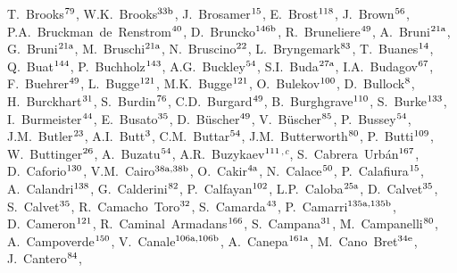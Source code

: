 \begin{flushleft}
T.~Brooks$^\textrm{\scriptsize 79}$,
W.K.~Brooks$^\textrm{\scriptsize 33b}$,
J.~Brosamer$^\textrm{\scriptsize 15}$,
E.~Brost$^\textrm{\scriptsize 118}$,
J.~Brown$^\textrm{\scriptsize 56}$,
P.A.~Bruckman~de~Renstrom$^\textrm{\scriptsize 40}$,
D.~Bruncko$^\textrm{\scriptsize 146b}$,
R.~Bruneliere$^\textrm{\scriptsize 49}$,
A.~Bruni$^\textrm{\scriptsize 21a}$,
G.~Bruni$^\textrm{\scriptsize 21a}$,
M.~Bruschi$^\textrm{\scriptsize 21a}$,
N.~Bruscino$^\textrm{\scriptsize 22}$,
L.~Bryngemark$^\textrm{\scriptsize 83}$,
T.~Buanes$^\textrm{\scriptsize 14}$,
Q.~Buat$^\textrm{\scriptsize 144}$,
P.~Buchholz$^\textrm{\scriptsize 143}$,
A.G.~Buckley$^\textrm{\scriptsize 54}$,
S.I.~Buda$^\textrm{\scriptsize 27a}$,
I.A.~Budagov$^\textrm{\scriptsize 67}$,
F.~Buehrer$^\textrm{\scriptsize 49}$,
L.~Bugge$^\textrm{\scriptsize 121}$,
M.K.~Bugge$^\textrm{\scriptsize 121}$,
O.~Bulekov$^\textrm{\scriptsize 100}$,
D.~Bullock$^\textrm{\scriptsize 8}$,
H.~Burckhart$^\textrm{\scriptsize 31}$,
S.~Burdin$^\textrm{\scriptsize 76}$,
C.D.~Burgard$^\textrm{\scriptsize 49}$,
B.~Burghgrave$^\textrm{\scriptsize 110}$,
S.~Burke$^\textrm{\scriptsize 133}$,
I.~Burmeister$^\textrm{\scriptsize 44}$,
E.~Busato$^\textrm{\scriptsize 35}$,
D.~B\"uscher$^\textrm{\scriptsize 49}$,
V.~B\"uscher$^\textrm{\scriptsize 85}$,
P.~Bussey$^\textrm{\scriptsize 54}$,
J.M.~Butler$^\textrm{\scriptsize 23}$,
A.I.~Butt$^\textrm{\scriptsize 3}$,
C.M.~Buttar$^\textrm{\scriptsize 54}$,
J.M.~Butterworth$^\textrm{\scriptsize 80}$,
P.~Butti$^\textrm{\scriptsize 109}$,
W.~Buttinger$^\textrm{\scriptsize 26}$,
A.~Buzatu$^\textrm{\scriptsize 54}$,
A.R.~Buzykaev$^\textrm{\scriptsize 111}$$^{,c}$,
S.~Cabrera~Urb\'an$^\textrm{\scriptsize 167}$,
D.~Caforio$^\textrm{\scriptsize 130}$,
V.M.~Cairo$^\textrm{\scriptsize 38a,38b}$,
O.~Cakir$^\textrm{\scriptsize 4a}$,
N.~Calace$^\textrm{\scriptsize 50}$,
P.~Calafiura$^\textrm{\scriptsize 15}$,
A.~Calandri$^\textrm{\scriptsize 138}$,
G.~Calderini$^\textrm{\scriptsize 82}$,
P.~Calfayan$^\textrm{\scriptsize 102}$,
L.P.~Caloba$^\textrm{\scriptsize 25a}$,
D.~Calvet$^\textrm{\scriptsize 35}$,
S.~Calvet$^\textrm{\scriptsize 35}$,
R.~Camacho~Toro$^\textrm{\scriptsize 32}$,
S.~Camarda$^\textrm{\scriptsize 43}$,
P.~Camarri$^\textrm{\scriptsize 135a,135b}$,
D.~Cameron$^\textrm{\scriptsize 121}$,
R.~Caminal~Armadans$^\textrm{\scriptsize 166}$,
S.~Campana$^\textrm{\scriptsize 31}$,
M.~Campanelli$^\textrm{\scriptsize 80}$,
A.~Campoverde$^\textrm{\scriptsize 150}$,
V.~Canale$^\textrm{\scriptsize 106a,106b}$,
A.~Canepa$^\textrm{\scriptsize 161a}$,
M.~Cano~Bret$^\textrm{\scriptsize 34e}$,
J.~Cantero$^\textrm{\scriptsize 84}$,
$$
\end{flushleft}
